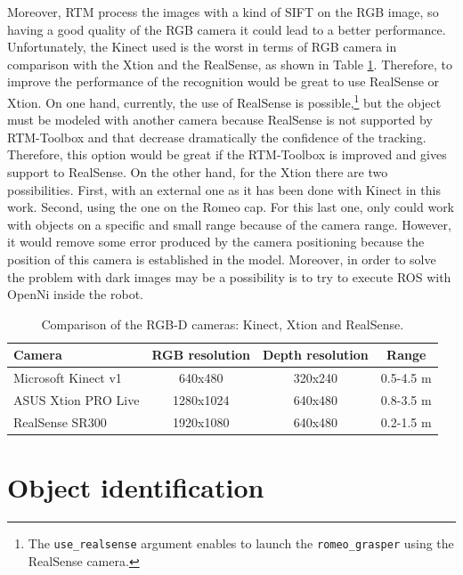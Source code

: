 \documentclass[12pt,a4paper,final,twoside,openright]{report}
\begin{document}
Moreover, RTM process the images with a kind of SIFT on the RGB image, so having a good quality of the RGB camera it could lead to a better performance. Unfortunately, the Kinect used is the worst in terms of RGB camera in comparison with the Xtion and the RealSense, as shown in Table \ref{tab:camera_comparison}. Therefore, to improve the performance of the recognition would be great to use RealSense or Xtion. On one hand, currently, the use of RealSense is possible,\footnote{The \texttt{use\_realsense} argument enables to launch the \texttt{romeo\_grasper} using the RealSense camera.} but the object must be modeled with another camera because RealSense is not supported by RTM-Toolbox and that decrease dramatically the confidence of the tracking. Therefore, this option would be great if the RTM-Toolbox is improved and gives support to RealSense. On the other hand, for the Xtion there are two possibilities. First, with an external one as it has been done with Kinect in this work. Second, using the one on the Romeo cap. For this last one, only could work with objects on a specific and small range because of the camera range. However, it would remove some error produced by the camera positioning because the position of this camera is established in the model. Moreover, in order to solve the problem with dark images may be a possibility is to try to execute ROS with OpenNi inside the robot.  

\begin{table}[h]
\begin{center}
\begin{tabular}{|l|c|c|c|}
\hline
\textbf{Camera} & \textbf{RGB resolution} & \textbf{Depth resolution} & \textbf{Range} \\ \hline
Microsoft Kinect v1 \cite{Smeenk}& 640x480 & 320x240 & 0.5-4.5 m \\
ASUS Xtion PRO Live \cite{ASUSWeb}& 1280x1024 & 640x480 & 0.8-3.5 m \\
RealSense SR300 \cite{intelWeb}& 1920x1080 & 640x480 & 0.2-1.5 m \\ \hline
\end{tabular}
\caption{Comparison of the RGB-D cameras: Kinect, Xtion and RealSense.\label{tab:camera_comparison}}
\end{center}
\end{table}

\vspace{-10pt}
\section{Object identification}
\label{sec:object_ident}
\end{document}

